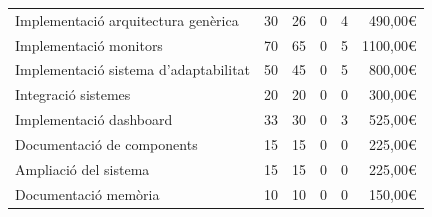 \begin{table}[htb]
{\begin{tabular}{lrrrrr}
\hline
Implementació arquitectura genèrica                       & 30                                           & 26                                             & 0                                        & 4                                          & 490,00\euro                                        \\
Implementació monitors                       & 70                                           & 65                                             & 0                                        & 5                                          & 1100,00\euro                                        \\
Implementació sistema d'adaptabilitat                      & 50                                           & 45                                             &0                                        & 5                                          & 800,00\euro                                        \\
Integració sistemes                      & 20                                           & 20                                             & 0                                        & 0                                          & 300,00\euro                                        \\
Implementació dashboard                      & 33                                           & 30                                             & 0                                        & 3                                          & 525,00\euro                                        \\
Documentació de components                   & 15                                           & 15                                             & 0                                        & 0                                          & 225,00\euro                                        \\
Ampliació del sistema                        & 15                                           & 15                                             & 0                                        & 0                                          & 225,00\euro                                        \\
Documentació memòria                         & 10                                           & 10                                             & 0                                        & 0                                          & 150,00\euro                                        \\

\end{tabular}}
\end{table}

